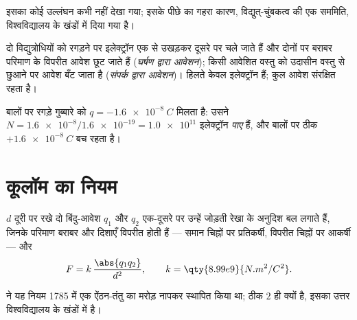\begin{remark}\label{rem:g11:fundamental-interactions:conservation}
इसका कोई उल्लंघन कभी नहीं देखा गया; इसके पीछे का गहरा कारण, विद्युत्-चुंबकत्व
की एक सममिति, विश्वविद्यालय के खंडों में दिया गया है।
\end{remark}

\begin{definition}[घर्षण और संपर्क से आवेशन]\label{def:g11:fundamental-interactions:charging}
दो विद्युत्रोधियों को रगड़ने पर इलेक्ट्रॉन एक से उखड़कर दूसरे पर चले जाते हैं
और दोनों पर बराबर परिमाण के विपरीत आवेश छूट जाते हैं (\emph{घर्षण द्वारा
आवेशन}); किसी आवेशित वस्तु को उदासीन वस्तु से छुआने
पर आवेश बँट जाता है (\emph{संपर्क द्वारा आवेशन})।
हिलते केवल इलेक्ट्रॉन हैं; कुल आवेश संरक्षित रहता है।
\end{definition}

\begin{example}[इलेक्ट्रॉन गिनना]\label{ex:g11:fundamental-interactions:balloon}
बालों पर रगड़े गुब्बारे को $q = \qty{-1.6e-8}{C}$ मिलता है: उसने
$N = \num{1.6e-8} / \num{1.6e-19} = \num{1.0e11}$ इलेक्ट्रॉन \emph{पाए} हैं, और बालों पर ठीक $+\qty{1.6e-8}{C}$ बच रहता है।
\end{example}

\section{कूलॉम का नियम}

\begin{theorem}[कूलॉम का नियम]\label{thm:g11:fundamental-interactions:coulomb}
$d$ दूरी पर रखे दो बिंदु-आवेश $q_1$ और $q_2$ एक-दूसरे पर उन्हें जोड़ती
रेखा के अनुदिश बल लगाते हैं, जिनके परिमाण बराबर और दिशाएँ विपरीत
होती हैं --- समान चिह्नों पर प्रतिकर्षी, विपरीत चिह्नों पर आकर्षी --- और
\[
F = k\,\frac{\abs{q_1 q_2}}{d^{2}},
\qquad k = \qty{8.99e9}{N.m^2/C^2}.
\]
\end{theorem}
\admitted

\begin{remark}\label{rem:g11:fundamental-interactions:torsion}
 ने यह नियम 1785 में एक  ऐंठन-तंतु का मरोड़ नापकर स्थापित
किया था;  ठीक $2$ ही क्यों है, इसका उत्तर विश्वविद्यालय के
खंडों में है।
\end{remark}

